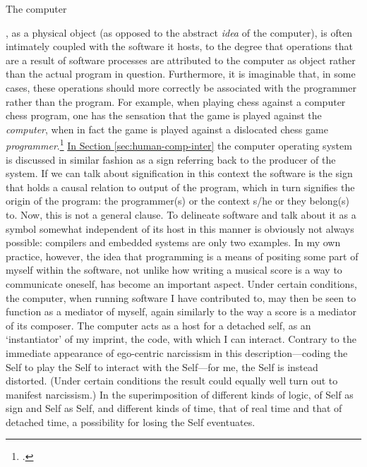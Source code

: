 \hypertarget{sec:target:overview-1}{The computer}, as a physical object (as opposed to the abstract \emph{idea} of the computer), is often intimately coupled with the software it hosts, to the degree that operations that are a result of software processes are attributed to the computer as object rather than the actual program in question. Furthermore, it is imaginable that, in some cases, these operations should more correctly be associated with the programmer rather than the program. For example, when playing chess against a computer chess program, one has the sensation that the game is played against the \emph{computer}, when in fact the game is played against a dislocated chess game \emph{programmer}.\footcites[See J. Gilmore as quoted in][]{arendt77}[See also][]{baudrillard02:blue} \hyperlink{sec:target:human-comp-inter:par3}{In Section \ref*{sec:human-comp-inter}} the computer operating system is discussed in similar fashion as a sign referring back to the producer of the system. If we can talk about signification in this context the software is the sign that holds a causal relation to output of the program, which in turn signifies the origin of the program: the programmer(s) or the context s/he or they belong(s) to. Now, this is not a general clause. To delineate software and talk about it as a symbol somewhat independent of its host in this manner is obviously not always possible: compilers and embedded systems are only two examples. In my own practice, however, the idea that programming is a means of positing some part of myself within the software, not unlike how writing a musical score is a way to communicate oneself, has become an important aspect. Under certain conditions, the computer, when running software I have contributed to, may then be seen to function as a mediator of myself, again similarly to the way a score is a mediator of its composer. The computer acts as a host for a detached self, as an `instantiator' of my imprint, the code, with which I can interact. Contrary to the immediate appearance of ego-centric narcissism in this description---coding the Self to play the Self to interact with the Self---for me, the Self is instead distorted. (Under certain conditions the result could equally well turn out to manifest narcissism.) In the superimposition of different kinds of logic, of Self as sign and Self as Self, and different kinds of time, that of real time and that of detached time, a possibility for losing the Self eventuates.
\newpage
